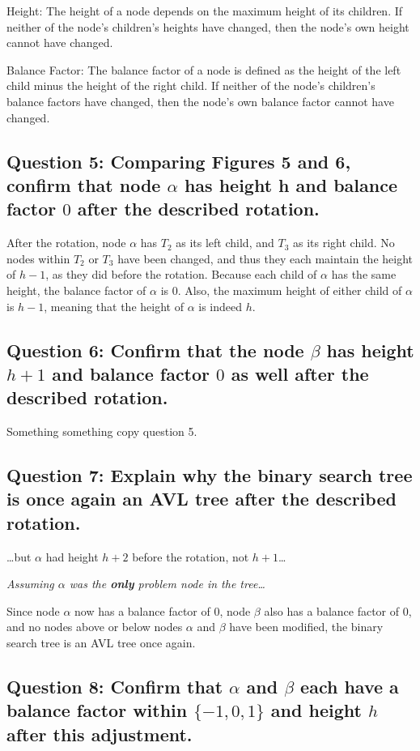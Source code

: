 \documentclass[a4paper, 12pt, titlepage]{article}
\begin{document}
Height: 
The height of a node depends on the maximum height of its children. 
If neither of the node's children's heights have changed, 
then the node's own height cannot have changed.

Balance Factor: 
The balance factor of a node is defined as the height of the left child minus the height of the right child. 
If neither of the node's children's balance factors have changed, 
then the node's own balance factor cannot have changed.

\subsection*{Question 5: Comparing Figures 5 and 6, confirm that node $\alpha$ has height h and balance factor $0$ after the described rotation.} 

After the rotation, 
node $\alpha$ has $T_2$ as its left child, 
and $T_3$ as its right child. 
No nodes within $T_2$ or $T_3$ have been changed, 
and thus they each maintain the height of $h-1$, 
as they did before the rotation. 
Because each child of $\alpha$ has the same height, 
the balance factor of $\alpha$ is $0$. 
Also, 
the maximum height of either child of $\alpha$ is $h-1$, 
meaning that the height of $\alpha$ is indeed $h$.

\subsection*{Question 6: Confirm that the node $\beta$ has height $h+1$ and balance factor $0$ as well after the described rotation.} 

Something something copy question 5.

\subsection*{Question 7: Explain why the binary search tree is once again an AVL tree after the described rotation.} 

\ldots but $\alpha$ had height $h+2$ before the rotation,
not $h+1$\ldots

\textit{Assuming $\alpha$ was the \textbf{only} problem node in the tree\ldots}

Since node $\alpha$ now has a balance factor of $0$,
node $\beta$ also has a balance factor of $0$,
and no nodes above or below nodes $\alpha$ and $\beta$ have been modified,
the binary search tree is an AVL tree once again.

\subsection*{Question 8: Confirm that $\alpha$ and $\beta$ each have a balance factor within $\{−1, 0, 1\}$ and height $h$ after this adjustment.} 
\end{document}
